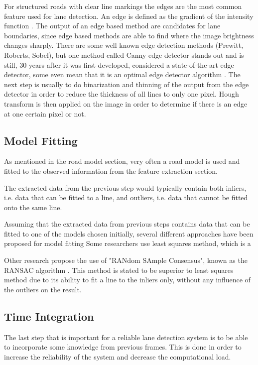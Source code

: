 For structured roads with clear line markings the edges are the most common feature used for lane detection. An edge is defined as the gradient of the intensity function \cite{Yenikaya:2013:KVR:2522968.2522970}. The output of an edge based method are candidates for lane boundaries, since edge based methods are able to find where the image brightness changes sharply. There are some well known edge detection methods (Prewitt, Roberts, Sobel), but one method called Canny edge detector stands out and is still, 30 years after it was first developed, considered a state-of-the-art edge detector, some even mean that it is an optimal edge detector algorithm \cite{bhadauria2013comparison}. The next step is usually to do binarization and thinning of the output from the edge detector in order to reduce the thickness of all lines to only one pixel. Hough transform is then applied on the image in order to determine if there is an edge at one certain pixel or not. 


\subsection{Model Fitting}
As mentioned in the road model section, very often a road model is used and fitted to the observed information from the feature extraction section. 

The extracted data from the previous step would typically contain both inliers, i.e. data that can be fitted to a line, and outliers, i.e. data that cannot be fitted onto the same line. \cite{raguram2008comparative}

Assuming that the extracted data from previous steps contains data that can be fitted to one of the models chosen initially, several different approaches have been proposed for model fitting \cite{BarHillel2014} 
Some researchers use least squares method, which is a 

Other research propose the use of "RANdom SAmple Consensus", known as the RANSAC algorithm \cite{huang2009finding}\cite{aly2008real} \cite{li2013lane}. This method is stated to be superior to least squares method due to its ability to fit a line to the inliers only, without any influence of the outliers on the result.  


\subsection{Time Integration}
The last step that is important for a reliable lane detection system is to be able to incorporate some knowledge from previous frames. This is done in order to increase the reliability of the system and decrease the computational load.


